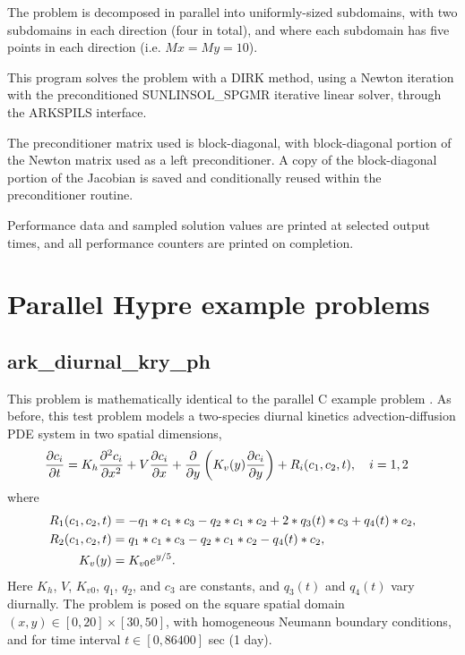 \documentclass[letterpaper,10pt,english]{sphinxmanual}
\begin{document}
The problem is decomposed in parallel into uniformly-sized subdomains,
with two subdomains in each direction (four in total), and where each
subdomain has five points in each direction (i.e. \(Mx=My=10\)).

This program solves the problem with a DIRK method, using a Newton
iteration with the preconditioned SUNLINSOL\_SPGMR iterative linear
solver, through the ARKSPILS interface.

The preconditioner matrix used is block-diagonal, with block-diagonal
portion of the Newton matrix used as a left preconditioner.  A copy of
the block-diagonal portion of the Jacobian is saved and conditionally
reused within the preconditioner routine.

Performance data and sampled solution values are printed at
selected output times, and all performance counters are printed
on completion.


\chapter{Parallel Hypre example problems}
\label{c_parhyp:parhyp-c}\label{c_parhyp::doc}\label{c_parhyp:parallel-hypre-example-problems}

\section{ark\_diurnal\_kry\_ph}
\label{c_parhyp:ark-diurnal-kry-ph}\label{c_parhyp:id1}
This problem is mathematically identical to the parallel C example
problem {\hyperref[c_parallel:ark-diurnal-kry-p]{\emph{}}}.  As before, this test problem models
a two-species diurnal kinetics advection-diffusion PDE system in two
spatial dimensions,
\begin{gather}
\begin{split}\frac{\partial c_i}{\partial t} &=
  K_h \frac{\partial^2 c_i}{\partial x^2} +
  V \frac{\partial     c_i}{\partial x} +
  \frac{\partial}{\partial y}\left( K_v(y)
  \frac{\partial c_i}{\partial y}\right) +
  R_i(c_1,c_2,t),\quad i=1,2\end{split}\notag
\end{gather}
where
\begin{gather}
\begin{split}R_1(c_1,c_2,t) &= -q_1*c_1*c_3 - q_2*c_1*c_2 + 2*q_3(t)*c_3 + q_4(t)*c_2, \\
R_2(c_1,c_2,t) &=  q_1*c_1*c_3 - q_2*c_1*c_2 - q_4(t)*c_2, \\
K_v(y) &= K_{v0} e^{y/5}.\end{split}\notag
\end{gather}
Here \(K_h\), \(V\), \(K_{v0}\), \(q_1\), \(q_2\),
and \(c_3\) are constants, and \(q_3(t)\) and \(q_4(t)\)
vary diurnally.  The problem is posed on the square spatial domain
\((x,y) \in [0,20]\times[30,50]\), with homogeneous Neumann
boundary conditions, and for time interval \(t\in [0,86400]\) sec
(1 day).
\end{document}
